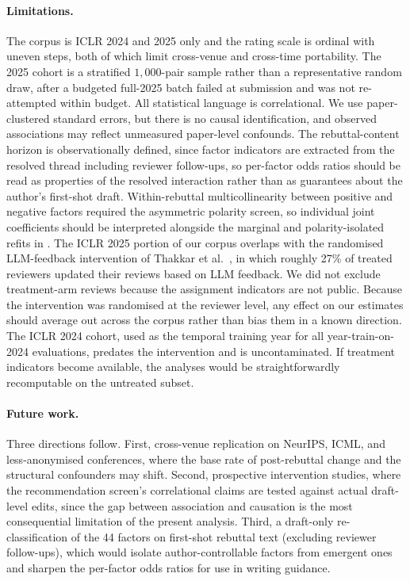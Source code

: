 \documentclass{article}
\begin{document}
\paragraph{Limitations.} The corpus is ICLR 2024 and 2025 only and the rating scale is ordinal with uneven steps, both of which limit cross-venue and cross-time portability. The 2025 cohort is a stratified $1{,}000$-pair sample rather than a representative random draw, after a budgeted full-2025 batch failed at submission and was not re-attempted within budget. All statistical language is correlational. We use paper-clustered standard errors, but there is no causal identification, and observed associations may reflect unmeasured paper-level confounds. The rebuttal-content horizon is observationally defined, since factor indicators are extracted from the resolved thread including reviewer follow-ups, so per-factor odds ratios should be read as properties of the resolved interaction rather than as guarantees about the author's first-shot draft. Within-rebuttal multicollinearity between positive and negative factors required the asymmetric polarity screen, so individual joint coefficients should be interpreted alongside the marginal and polarity-isolated refits in . The ICLR 2025 portion of our corpus overlaps with the randomised LLM-feedback intervention of Thakkar et al.~\cite{thakkar}, in which roughly 27\% of treated reviewers updated their reviews based on LLM feedback. We did not exclude treatment-arm reviews because the assignment indicators are not public. Because the intervention was randomised at the reviewer level, any effect on our estimates should average out across the corpus rather than bias them in a known direction. The ICLR 2024 cohort, used as the temporal training year for all year-train-on-2024 evaluations, predates the intervention and is uncontaminated. If treatment indicators become available, the analyses would be straightforwardly recomputable on the untreated subset.

\paragraph{Future work.} Three directions follow. First, cross-venue replication on NeurIPS, ICML, and less-anonymised conferences, where the base rate of post-rebuttal change and the structural confounders may shift. Second, prospective intervention studies, where the recommendation screen's correlational claims are tested against actual draft-level edits, since the gap between association and causation is the most consequential limitation of the present analysis. Third, a draft-only re-classification of the 44 factors on first-shot rebuttal text (excluding reviewer follow-ups), which would isolate author-controllable factors from emergent ones and sharpen the per-factor odds ratios for use in writing guidance.
\end{document}

